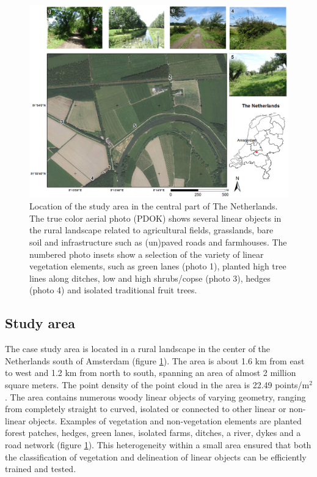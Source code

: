 \begin{figure}
	\centering
	\includegraphics[scale=0.8]{./img/studyarea}
	\caption{Location of the study area in the central part of The Netherlands. The true color aerial photo (PDOK) shows several linear objects in the rural landscape related to agricultural fields, grasslands, bare soil and infrastructure such as (un)paved roads and farmhouses. The numbered photo insets show a selection of the variety of linear vegetation elements, such as green lanes (photo 1), planted high tree lines along ditches, low and high shrubs/copse (photo 3), hedges (photo 4) and isolated traditional fruit trees.}
	\label{fig:studyarea}
\end{figure}

\subsection{Study area}
The case study area is located in a rural landscape in the center of the Netherlands south of Amsterdam (figure \ref{fig:studyarea}). The area is about 1.6 km from east to west and 1.2 km from north to south, spanning an area of almost 2 million square meters. The point density of the point cloud in the area is 22.49 points/m$^2$. The area contains numerous woody linear objects of varying geometry, ranging from completely straight to curved, isolated or connected to other linear or non-linear objects. Examples of vegetation and non-vegetation elements are planted forest patches, hedges, green lanes, isolated farms, ditches, a river, dykes and a road network (figure \ref{fig:studyarea}). This heterogeneity within a small area ensured that both the classification of vegetation and delineation of linear objects can be efficiently trained and tested.